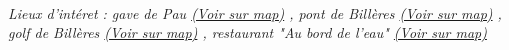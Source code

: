 \documentclass{article}
\begin{document}
        \\\emph{Lieux d'intéret : gave de Pau 
        \href{https://www.google.com/maps/?q=43.287530, -0.391115}{(Voir sur map)}
        , pont de Billères 
        \href{https://www.google.com/maps/?q=43.287530, -0.391115}{(Voir sur map)}
        , golf de Billères 
        \href{https://www.google.com/maps/?q=43.287530, -0.391115}{(Voir sur map)}
        , restaurant "Au bord de l'eau" 
        \href{https://www.google.com/maps/?q=43.287530, -0.391115}{(Voir sur map)}
        }\\~\\
\end{document}
